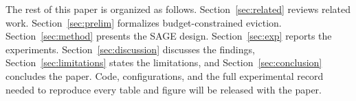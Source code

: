 The rest of this paper is organized as follows.
Section~\ref{sec:related} reviews related work.
Section~\ref{sec:prelim} formalizes budget-constrained eviction.
Section~\ref{sec:method} presents the SAGE design.
Section~\ref{sec:exp} reports the experiments.
Section~\ref{sec:discussion} discusses the findings,
Section~\ref{sec:limitations} states the limitations, and
Section~\ref{sec:conclusion} concludes the paper. Code, configurations,
and the full experimental record needed to reproduce every table and
figure will be released with the paper.
